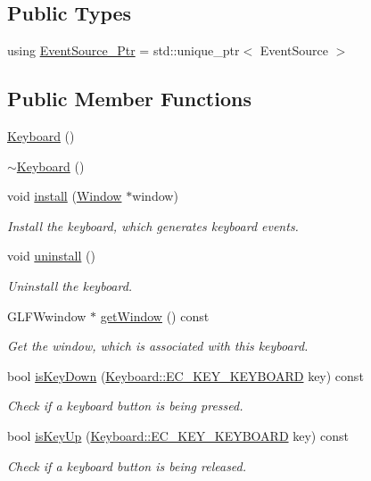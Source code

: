 \subsection*{Public Types}
\begin{DoxyCompactItemize}
\item 
using \mbox{\hyperlink{classec_1_1_keyboard_a9d797ac5b4d42f3b586091bcc14e6343}{Event\+Source\+\_\+\+Ptr}} = std\+::unique\+\_\+ptr$<$ Event\+Source $>$
\end{DoxyCompactItemize}
\subsection*{Public Member Functions}
\begin{DoxyCompactItemize}
\item 
\mbox{\hyperlink{classec_1_1_keyboard_aca1d01cce4b8449083c32e2a167a3448}{Keyboard}} ()
\item 
\mbox{\hyperlink{classec_1_1_keyboard_a817f6cd6ea29898c6651dee24de59ba5}{$\sim$\+Keyboard}} ()
\item 
void \mbox{\hyperlink{classec_1_1_keyboard_af792a3b8226096510f6dfecc57697f8e}{install}} (\mbox{\hyperlink{classec_1_1_window}{Window}} $\ast$window)
\begin{DoxyCompactList}\small\item\em Install the keyboard, which generates keyboard events. \end{DoxyCompactList}\item 
void \mbox{\hyperlink{classec_1_1_keyboard_a1e60401ed958ec3d94a77b1dda9f44e8}{uninstall}} ()
\begin{DoxyCompactList}\small\item\em Uninstall the keyboard. \end{DoxyCompactList}\item 
G\+L\+F\+Wwindow $\ast$ \mbox{\hyperlink{classec_1_1_keyboard_ad6b17bd2f2853def1e6ec21fadd9b658}{get\+Window}} () const
\begin{DoxyCompactList}\small\item\em Get the window, which is associated with this keyboard. \end{DoxyCompactList}\item 
bool \mbox{\hyperlink{classec_1_1_keyboard_a47779c0842584eb4337e1aa63e7d7a35}{is\+Key\+Down}} (\mbox{\hyperlink{classec_1_1_keyboard_a135ca08df15aebf8c93ce3cc76288a6e}{Keyboard\+::\+E\+C\+\_\+\+K\+E\+Y\+\_\+\+K\+E\+Y\+B\+O\+A\+RD}} key) const
\begin{DoxyCompactList}\small\item\em Check if a keyboard button is being pressed. \end{DoxyCompactList}\item 
bool \mbox{\hyperlink{classec_1_1_keyboard_a0d260eb1df363be405af8a967aa8b5b6}{is\+Key\+Up}} (\mbox{\hyperlink{classec_1_1_keyboard_a135ca08df15aebf8c93ce3cc76288a6e}{Keyboard\+::\+E\+C\+\_\+\+K\+E\+Y\+\_\+\+K\+E\+Y\+B\+O\+A\+RD}} key) const
\begin{DoxyCompactList}\small\item\em Check if a keyboard button is being released. \end{DoxyCompactList}\end{DoxyCompactItemize}

